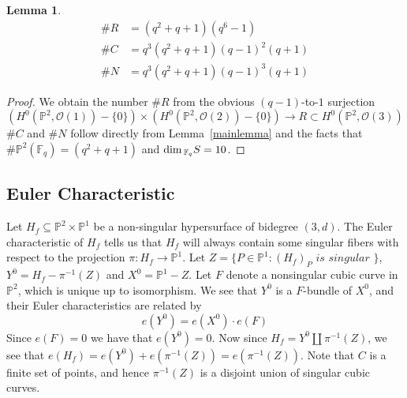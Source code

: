 \documentclass[12pt]{article}
\theoremstyle{plain}
\newtheorem{lemma}[equation]{Lemma}
\theoremstyle{definition}
\newcommand{\IF}{\mathbb{F}}
\newcommand{\IP}{\mathbb{P}}
\newcommand{\sO}{\mathcal{O}}
\renewcommand\dim{{\rm dim\,}}
\newcommand{\<}{\langle}
\renewcommand{\>}{\rangle}
\begin{document}
\begin{lemma}
\begin{align*}
\# R &= (q^2 + q + 1)(q^6 - 1)\\
\# C &= q^3 (q^2 + q + 1) (q - 1)^2 (q + 1) \\
\# N &= q^3 (q^2 + q + 1) (q - 1)^3 (q + 1)
\end{align*}
\end{lemma}
\begin{proof}
We obtain the number $\# R$ from the obvious $(q - 1)$-to-$1$ surjection 
$$ (H^0(\IP^2, \sO(1)) - \{ 0 \}) \times (H^0(\IP^2, \sO(2)) - \{ 0 \}) \to R \subset H^0(\IP^2, \sO(3))$$
$\# C$ and $\# N$ follow directly from Lemma~\ref{mainlemma} and the facts that $\# \IP^2(\IF_q) = (q^2 + q + 1)$ and $\dim_{\IF_q} S = 10$. 
\end{proof}

\subsection{Euler Characteristic}
Let $H_f \subseteq \IP^2 \times \IP^1$ be a non-singular hypersurface of bidegree $(3, d)$.  The Euler characteristic of $H_f$ tells us that $H_f$ will always contain some singular fibers with respect to the projection $\pi : H_f \to \IP^1$. Let $Z = \{ P \in \IP^1 : (H_f)_P \textit{ is singular }\}$, $Y^0 = H_f - \pi^{-1}(Z)$ and $X^0 = \IP^1 - Z$. Let $F$ denote a nonsingular cubic curve in $\IP^2$, which is unique up to isomorphism. We see that $Y^0$ is a $F$-bundle of $X^0$, and their Euler characteristics are related by 
$$ e(Y^0) = e(X^0 ) \cdot e(F) $$ 
Since $e(F) = 0$ we have that $e(Y^0) = 0$. Now since $H_f = Y^0 \coprod \pi^{-1}(Z)$, we see that $e(H_f) = e(Y^0) + e(\pi^{-1}(Z)) = e(\pi^{-1}(Z))$. Note that $C$ is a finite set of points, and hence $\pi^{-1} (Z)$ is a disjoint union of singular cubic curves. 
\end{document}
